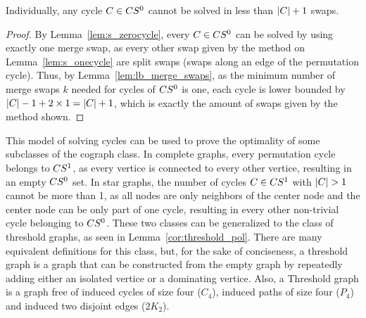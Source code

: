 \documentclass[msc]{ppgccufmg}    %
\begin{document}
\begin{lemma}
\label{lem:m_zerocycle}
Individually, any cycle $C \in CS^{0}$ cannot be solved in less
than $|C| + 1$ swaps.
\end{lemma}


\begin{proof}
By Lemma~\ref{lem:s_zerocycle}, every $C \in CS^{0}$ can be solved
by using exactly one merge swap, as every other swap given by the method
on Lemma~\ref{lem:s_onecycle} are split swaps (swaps along an edge of the
permutation cycle).
Thus, by Lemma~\ref{lem:lb_merge_swaps}, as the minimum number of merge 
swaps $k$ needed for cycles of $CS^{0}$ is one, each cycle 
is lower bounded by $|C| - 1 + 2\times1 = |C| + 1$, 
which is exactly the amount of swaps given by the method shown. 
\end{proof}

This model of solving cycles can be used to prove the optimality of some
subclasses of the cograph class.
In complete graphs, every permutation cycle belongs to $CS^{1}$, as
every vertice is connected to every other vertice, resulting in an empty
$CS^{0}$ set.
In star graphs, the number of cycles $C \in CS^{1}$ with 
$|C| > 1$ cannot be more than 1, as all nodes are only 
neighbors of the center node and the center node can be only part 
of one cycle, resulting in every other non-trivial cycle belonging to 
$CS^{0}$.
These two classes can be generalized to the class of threshold graphs, 
as seen in Lemma~\ref{cor:threshold_pol}.
There are many equivalent definitions for this class, but, for the sake
of conciseness, a threshold graph is a graph that can be constructed from
the empty graph by repeatedly adding either an isolated vertice or a
dominating vertice.
Also, a Threshold graph is a graph free of induced cycles of size four 
($C_{4}$), induced paths of size four ($P_{4}$) and induced two disjoint 
edges ($2K_{2}$).
\end{document}
